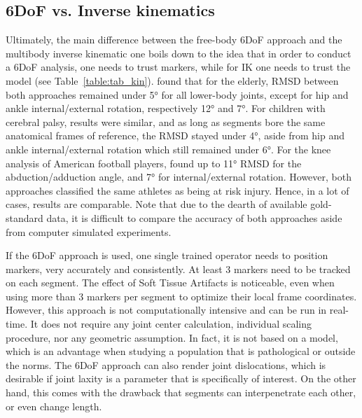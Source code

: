 \subsection{6DoF vs. Inverse kinematics}

Ultimately, the main difference between the free-body 6DoF approach and the multibody inverse kinematic one boils down to the idea that in order to conduct a 6DoF analysis, one needs to trust markers, while for IK one needs to trust the model (see Table~\ref{table:tab_kin}). \cite{Moniz2014} found that for the elderly, RMSD between both approaches remained under 5° for all lower-body joints, except for hip and ankle internal/external rotation, respectively 12° and 7°. For children with cerebral palsy, results were similar, and as long as segments bore the same anatomical frames of reference, the RMSD stayed under 4°, aside from hip and ankle internal/external rotation which still remained under 6°. For the knee analysis of American football players, \cite{Robinson2013} found up to 11° RMSD for the abduction/adduction angle, and 7° for internal/external rotation. However, both approaches classified the same athletes as being at risk injury. Hence, in a lot of cases, results are comparable. Note that due to the dearth of available gold-standard data, it is difficult to compare the accuracy of both approaches aside from computer simulated experiments.

If the 6DoF approach is used, one single trained operator needs to position markers, very accurately and consistently. At least 3 markers need to be tracked on each segment. The effect of Soft Tissue Artifacts is noticeable, even when using more than 3 markers per segment to optimize their local frame coordinates. However, this approach is not computationally intensive and can be run in real-time. It does not require any joint center calculation, individual scaling procedure, nor any geometric assumption. In fact, it is not based on a model, which is an advantage when studying a population that is pathological or outside the norms. The 6DoF approach can also render joint dislocations, which is desirable if joint laxity is a parameter that is specifically of interest. On the other hand, this comes with the drawback that segments can interpenetrate each other, or even change length.

